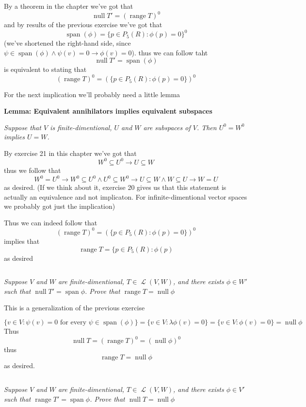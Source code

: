 \documentclass[11pt,oneside,titlepage]{book}
\DeclareMathOperator \map {\mathcal {L}}
\DeclareMathOperator \ns {null}
\DeclareMathOperator \range {range}
\DeclareMathOperator \Span {span}
\begin{document}
By a theorem in the chapter we've got that
$$\ns T' = (\range T)^0$$
and by results of the previous exercise we've got that
$$\Span(\phi) = \{p \in P_5(R): \phi(p) = 0\}^0$$
(we've shortened the right-hand side, since
$\psi \in \Span(\phi) \land \psi(v) = 0 \to \phi(v) = 0$).
thus we can follow taht 
$$\ns T' =  \Span(\phi)$$
is equivalent to stating that 
$$(\range T)^0 = (\{p \in P_5(R): \phi(p) = 0\})^0$$

For the next implication we'll probably need a little lemma

\textbf{Lemma: Equivalent annihilators implies equivalent subspaces}

\textit{
  Suppose that $V$ is finite-dimentional, 
  $U$ and $W$ are subspaces of $V$. Then $U^0 = W^0$ implies $U = W$.
}

By exercise 21 in this chapter we've got that
$$W^0 \subseteq U^0 \to U \subseteq W$$
thus we follow that
$$W^0 = U^0 \to W^0 \subseteq U^0 \land U^0 \subseteq W^0 \to
U \subseteq W \land W \subseteq U \to W = U$$
as desired. (If we think about it, exercise 20 gives us that this statement is actually an
equivalence and not implicaton. For infinite-dimentional vector spaces we probably got
just the implication)

Thus we can indeed follow that
$$(\range T)^0 = (\{p \in P_5(R): \phi(p) = 0\})^0$$
implies that
$$\range T = \{p \in P_5(R): \phi(p)$$
as desired

\subsection{}

\textit{Suppose $V$ and $W$ are finite-dimentional, $T \in \map (V, W)$, and there exists
  $\phi \in W'$ such that $\ns T' = \Span \phi$. Prove that $\range T = \ns \phi$}


This is a generalization of the previous exercise

$$\{v \in V: \psi(v) = 0 \text{ for every } \psi \in \Span(\phi)\} =
\{v \in V: \lambda \phi(v) = 0 \} = \{v \in V: \phi(v) = 0 \} = \ns \phi$$
Thus
$$\ns T = (\range T)^0 = (\ns \phi)^0$$
thus
$$\range T = \ns \phi$$
as desired.

\subsection{}

\textit{Suppose $V$ and $W$ are finite-dimentional, $T \in \map (V, W)$, and there exists
  $\phi \in V'$ such that $\range T' = \Span \phi$. Prove that $\ns T = \ns \phi$}
\end{document}
